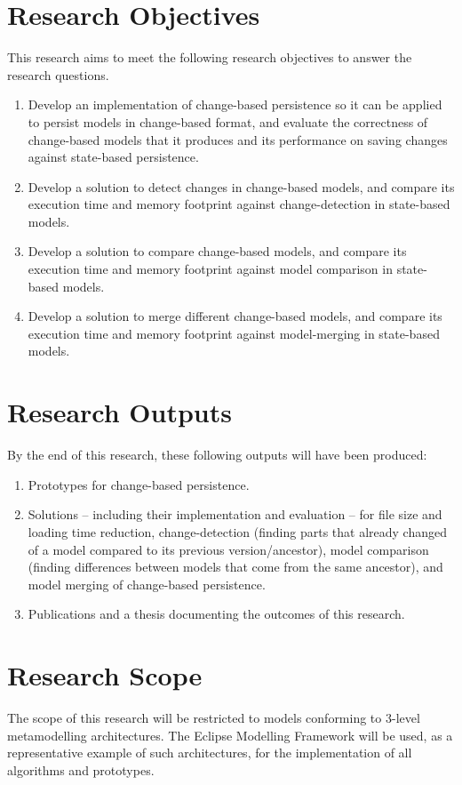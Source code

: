 \documentclass[12pt, a4paper]{report} \usepackage[titletoc]{appendix}
\begin{document}
\section{Research Objectives}
\label{sec:research_objectives}
This research aims to meet the following research objectives to answer the research questions.
\begin{enumerate}
\item Develop an implementation of change-based persistence so it can be applied to persist models in change-based format, and evaluate the correctness of change-based models that it produces and its performance on saving changes against state-based persistence. 
\item Develop a solution to detect changes in change-based models, and compare its execution time and memory footprint against change-detection in state-based models.
\item Develop a solution to compare change-based models, and compare its execution time and memory footprint against model comparison in state-based models.
\item Develop a solution to merge different change-based models, and compare its execution time and memory footprint against model-merging in state-based models. 
\end{enumerate}

\section{Research Outputs}
\label{sec:research_outputs}
By the end of this research, these following outputs will have been produced:
\begin{enumerate}
\item Prototypes for change-based persistence. 
\item Solutions -- including their implementation and evaluation -- for file size and loading time reduction, change-detection (finding parts that already changed of a model compared to its previous version/ancestor), model comparison (finding differences between models that come from the same ancestor), and model merging of change-based persistence.
\item Publications and a thesis documenting the outcomes of this research.
\end{enumerate}


\section{Research Scope}
\label{sec:research_scope}
The scope of this research will be restricted to models conforming to 3-level metamodelling architectures. The Eclipse Modelling Framework will be used, as a representative example of such architectures, for the implementation of all algorithms and prototypes.
\end{document}
